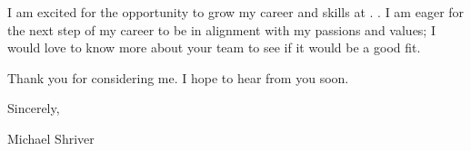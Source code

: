 \documentclass[10pt,oneside]{article}
\begin{document}
\vspace{\baselineskip}

I am excited for the opportunity to grow my career and skills at . . I am eager for the next step of my career to be in alignment with my passions and values; I would love to know more about your team to see if it would be a good fit.

\vspace{\baselineskip}

Thank you for considering me. I hope to hear from you soon.

\vspace{\baselineskip}

Sincerely,

\vspace{\baselineskip}

Michael Shriver
\end{document}

